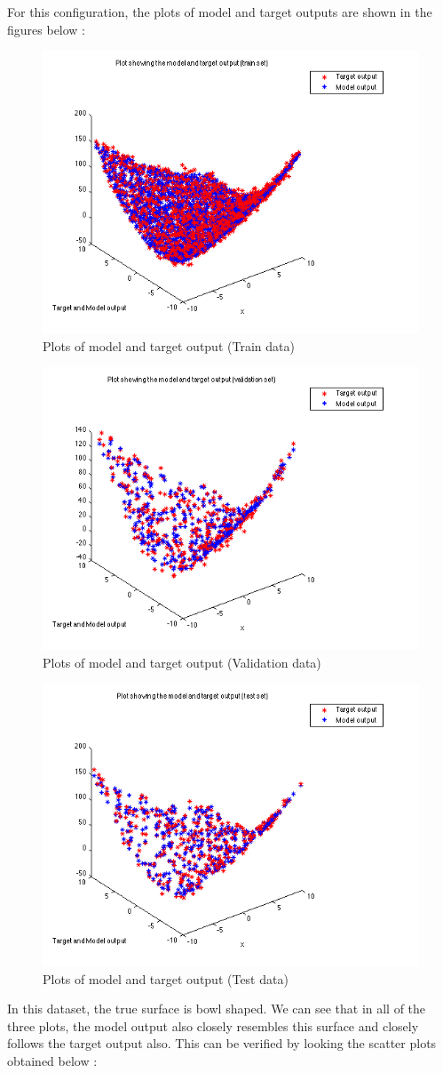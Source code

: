 \documentclass{article}
\begin{document}
For this configuration, the plots of model and target outputs are shown in the figures below : 

\begin{figure}[H]
\centering
\includegraphics[width=0.5\linewidth]{Regression/bivariate/output_1layer_train.png}
\caption{Plots of model and target output (Train data)}
\end{figure}

\begin{figure}[H]
\centering
\includegraphics[width=0.5\linewidth]{Regression/bivariate/output_1layer_val.png}
\caption{Plots of model and target output (Validation data)}
\end{figure}

\begin{figure}[H]
\centering
\includegraphics[width=0.5\linewidth]{Regression/bivariate/output_1layer_test.png}
\caption{Plots of model and target output (Test data)}
\end{figure}

\begin{flushleft}
In this dataset, the true surface is bowl shaped.  We can see that in all of the three plots, the model output also closely resembles this surface and closely follows the target output also. This can be verified by looking the scatter plots obtained below :
\end{flushleft}
\end{document}
